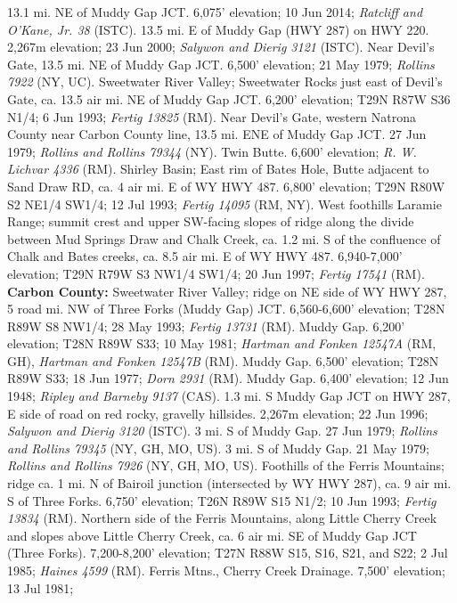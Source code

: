 13.1 mi. NE of Muddy Gap JCT. 6,075' elevation; 10 Jun 2014;
\textit{Ratcliff and O'Kane, Jr. 38} (ISTC).
13.5 mi. E of Muddy Gap (HWY 287) on HWY 220. 2,267m elevation; 23 Jun 2000;
\textit{Salywon and Dierig 3121} (ISTC).
Near Devil's Gate, 13.5 mi. NE of Muddy Gap JCT. 6,500' elevation;
21 May 1979; \textit{Rollins 7922} (NY, UC).
Sweetwater River Valley; Sweetwater Rocks just east of Devil's Gate, ca. 13.5
air mi. NE of Muddy Gap JCT. 6,200' elevation; T29N R87W S36 N1/4;
6 Jun 1993; \textit{Fertig 13825} (RM).
Near Devil's Gate, western Natrona County near Carbon County line, 13.5 mi. ENE
of Muddy Gap JCT. 27 Jun 1979; \textit{Rollins and Rollins 79344} (NY).
Twin Butte. 6,600' elevation; \textit{R. W. Lichvar 4336} (RM).
Shirley Basin; East rim of Bates Hole, Butte adjacent to Sand Draw RD, ca. 4
air mi. E of WY HWY 487. 6,800' elevation; T29N R80W S2 NE1/4 SW1/4;
12 Jul 1993; \textit{Fertig 14095} (RM, NY).
West foothills Laramie Range; summit crest and upper SW-facing slopes of ridge
along the divide between Mud Springs Draw and Chalk Creek, ca. 1.2 mi. S of the
confluence of Chalk and Bates creeks, ca. 8.5 air mi. E of WY HWY 487.
6,940-7,000' elevation; T29N R79W S3 NW1/4 SW1/4; 20 Jun 1997;
\textit{Fertig 17541} (RM).
  \textbf{Carbon County:}
Sweetwater River Valley; ridge on NE side of WY HWY 287, 5 road mi. NW of Three
Forks (Muddy Gap) JCT. 6,560-6,600' elevation; T28N R89W S8 NW1/4; 28 May 1993;
\textit{Fertig 13731} (RM).
Muddy Gap. 6,200' elevation; T28N R89W S33; 10 May 1981;
\textit{Hartman and Fonken 12547A} (RM, GH),
\textit{Hartman and Fonken 12547B} (RM).
Muddy Gap. 6,500' elevation; T28N R89W S33; 18 Jun 1977;
\textit{Dorn 2931} (RM).
Muddy Gap. 6,400' elevation; 12 Jun 1948;
\textit{Ripley and Barneby 9137} (CAS).
1.3 mi. S Muddy Gap JCT on HWY 287, E side of road on red rocky, gravelly
hillsides. 2,267m elevation; 22 Jun 1996;
\textit{Salywon and Dierig 3120} (ISTC).
3 mi. S of Muddy Gap. 27 Jun 1979;
\textit{Rollins and Rollins 79345} (NY, GH, MO, US).
3 mi. S of Muddy Gap. 21 May 1979;
\textit{Rollins and Rollins 7926} (NY, GH, MO, US).
Foothills of the Ferris Mountains; ridge ca. 1 mi. N of Bairoil junction
(intersected by WY HWY 287), ca. 9 air mi. S of Three Forks. 6,750' elevation;
T26N R89W S15 N1/2; 10 Jun 1993; \textit{Fertig 13834} (RM).
Northern side of the Ferris Mountains, along Little Cherry Creek and slopes
above Little Cherry Creek, ca. 6 air mi. SE of Muddy Gap JCT (Three Forks).
7,200-8,200' elevation; T27N R88W S15, S16, S21, and S22; 2 Jul 1985;
\textit{Haines 4599} (RM).
Ferris Mtns., Cherry Creek Drainage. 7,500' elevation; 13 Jul 1981;
